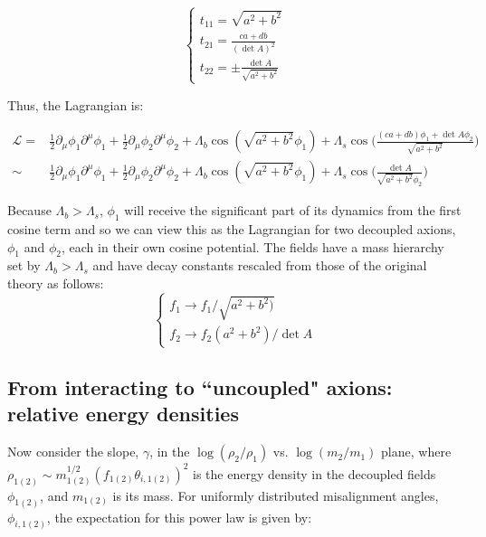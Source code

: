 \documentclass{article}
\begin{document}
\begin{equation}
    \begin{cases}
        t_{11} = \sqrt{a^2+b^2} \\
        t_{21} = \frac{ca+db}{(\det{A})^2} \\
        t_{22} = \pm \frac{\det{A}}{\sqrt{a^2+b^2}}
    \end{cases}
\end{equation}

Thus, the Lagrangian is:

\begin{align*}
   \mathcal{L} = &  \frac{1}{2}\partial_\mu\phi_1\partial^\mu\phi_1+\frac{1}{2}\partial_\mu\phi_2\partial^\mu\phi_2+\Lambda_b\cos{(\sqrt{a^2+b^2}\phi_1)}+\Lambda_s\cos{\bigg(\frac{(ca+db)\phi_1+\det{A}\phi_2}{\sqrt{a^2+b^2}}\bigg)} \\
   \sim & \frac{1}{2}\partial_\mu\phi_1\partial^\mu\phi_1+\frac{1}{2}\partial_\mu\phi_2\partial^\mu\phi_2+\Lambda_b\cos{(\sqrt{a^2+b^2}\phi_1)}+\Lambda_s\cos{\bigg(\frac{\det{A}}{\sqrt{a^2+b^2}\phi_2}\bigg)}
\end{align*}

Because $\Lambda_b>\Lambda_s$, $\phi_1$ will receive the significant part of its dynamics from the first cosine term and so we can view this as the Lagrangian for two decoupled axions, $\phi_1$ and $\phi_2$, each in their own cosine potential. The fields have a mass hierarchy set by $\Lambda_b>\Lambda_s$ and have decay constants rescaled from those of the original theory as follows:
\begin{equation}
    \label{eq:decay-consts-GS}
    \begin{cases}
        f_1 \rightarrow f_1/\sqrt{a^2+b^2)} \\
        f_2 \rightarrow f_2(a^2+b^2)/\det{A}
    \end{cases}
\end{equation}

\subsection{From interacting to ``uncoupled" axions: relative energy densities}
\label{subsec:GS-powerlaw}
Now consider the slope, $\gamma$, in the $\log{(\rho_2/\rho_1)}$ vs. $\log{(m_2/m_1)}$ plane, where $\rho_{1(2)}\sim m_{1(2)}^{1/2}(f_{1(2)}\theta_{i,1(2)})^2$ is the energy density in the decoupled fields $\phi_{1(2)}$, and $m_{1(2)}$ is its mass. For uniformly distributed misalignment angles, $\phi_{i,1(2)}$, the expectation for this power law is given by:
\end{document}
